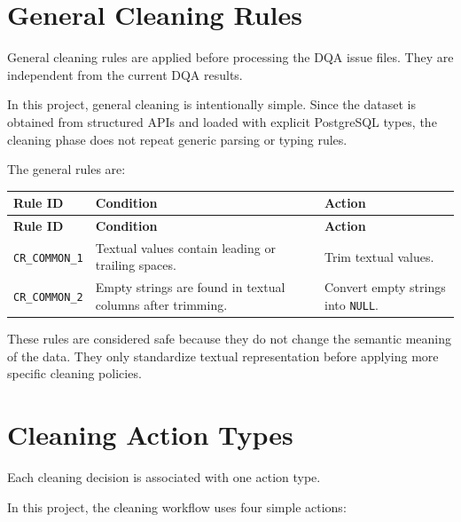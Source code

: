 \documentclass[a4paper,11pt]{article}
\begin{document}
	\section{General Cleaning Rules}
	
	General cleaning rules are applied before processing the DQA issue files.
	They are independent from the current DQA results.
	
	In this project, general cleaning is intentionally simple.
	Since the dataset is obtained from structured APIs and loaded with explicit PostgreSQL types, the cleaning phase does not repeat generic parsing or typing rules.
	
	The general rules are:
	
	\begin{longtable}{p{4cm}p{7cm}p{4cm}}
		\toprule
		\textbf{Rule ID} & \textbf{Condition} & \textbf{Action} \\
		\midrule
		\endfirsthead
		
		\toprule
		\textbf{Rule ID} & \textbf{Condition} & \textbf{Action} \\
		\midrule
		\endhead
		
		\texttt{CR\_COMMON\_1}
		& Textual values contain leading or trailing spaces.
		& Trim textual values. \\
		\midrule
		
		\texttt{CR\_COMMON\_2}
		& Empty strings are found in textual columns after trimming.
		& Convert empty strings into \texttt{NULL}. \\
		\bottomrule
	\end{longtable}
	
	These rules are considered safe because they do not change the semantic meaning of the data.
	They only standardize textual representation before applying more specific cleaning policies.
	
	\section{Cleaning Action Types}
	
	Each cleaning decision is associated with one action type.
	
	In this project, the cleaning workflow uses four simple actions:
	
\end{document}
